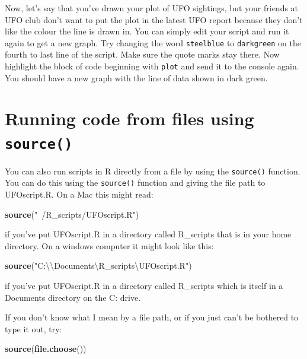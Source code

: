 \documentclass[
]{book}
\newenvironment{Shaded}{\begin{snugshade}}{\end{snugshade}}
\newcommand{\CharTok}[1]{\textcolor[rgb]{0.31,0.60,0.02}{#1}}
\newcommand{\KeywordTok}[1]{\textcolor[rgb]{0.13,0.29,0.53}{\textbf{#1}}}
\newcommand{\NormalTok}[1]{#1}
\newcommand{\StringTok}[1]{\textcolor[rgb]{0.31,0.60,0.02}{#1}}
\begin{document}
Now, let's say that you've drawn your plot of UFO sightings, but your friends at UFO club don't want to put the plot in the latest UFO report because they don't like the colour the line is drawn in. You can simply edit your script and run it again to get a new graph. Try changing the word \texttt{steelblue} to \texttt{darkgreen} on the fourth to last line of the script. Make sure the quote marks stay there. Now highlight the block of code beginning with \texttt{plot} and send it to the console again. You should have a new graph with the line of data shown in dark green.

\hypertarget{running-code-from-files-using-source}{%
\section{\texorpdfstring{Running code from files using \texttt{source()}}{Running code from files using source()}}\label{running-code-from-files-using-source}}

You can also run scripts in R directly from a file by using the \texttt{source()} function. You can do this using the \texttt{source()} function and giving the file path to UFOscript.R. On a Mac this might read:

\begin{Shaded}
\begin{Highlighting}[]
\KeywordTok{source}\NormalTok{(}\StringTok{"~/R_scripts/UFOscript.R"}\NormalTok{)}
\end{Highlighting}
\end{Shaded}

if you've put UFOscript.R in a directory called R\_scripts that is in your home directory. On a windows computer it might look like this:

\begin{Shaded}
\begin{Highlighting}[]
\KeywordTok{source}\NormalTok{(}\StringTok{"C:}\CharTok{\textbackslash{}\textbackslash{}}\StringTok{Documents\textbackslash{}R_scripts\textbackslash{}UFOscript.R"}\NormalTok{)}
\end{Highlighting}
\end{Shaded}

if you've put UFOscript.R in a directory called R\_scripts which is itself in a Documents directory on the C: drive.

If you don't know what I mean by a file path, or if you just can't be bothered to type it out, try:

\begin{Shaded}
\begin{Highlighting}[]
\KeywordTok{source}\NormalTok{(}\KeywordTok{file.choose}\NormalTok{())}
\end{Highlighting}
\end{Shaded}
\end{document}
